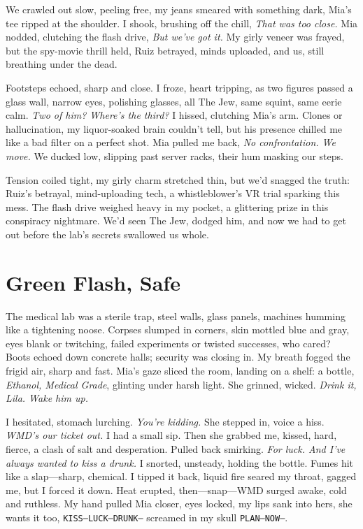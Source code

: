 \documentclass[12pt,oneside]{book}
\newcommand{\note}[1]{\texttt{#1}}
\begin{document}
We crawled out slow, peeling free, my jeans smeared with something dark, Mia’s tee ripped at the shoulder. I shook, brushing off the chill, \textit{That was too close.} Mia nodded, clutching the flash drive, \textit{But we’ve got it.} My girly veneer was frayed, but the spy-movie thrill held, Ruiz betrayed, minds uploaded, and us, still breathing under the dead.

Footsteps echoed, sharp and close. I froze, heart tripping, as two figures passed a glass wall, narrow eyes, polishing glasses, all The Jew, same squint, same eerie calm. \textit{Two of him? Where's the third?} I hissed, clutching Mia’s arm. Clones or hallucination, my liquor-soaked brain couldn’t tell, but his presence chilled me like a bad filter on a perfect shot. Mia pulled me back, \textit{No confrontation. We move.} We ducked low, slipping past server racks, their hum masking our steps.

Tension coiled tight, my girly charm stretched thin, but we’d snagged the truth: Ruiz’s betrayal, mind-uploading tech, a whistleblower’s VR trial sparking this mess. The flash drive weighed heavy in my pocket, a glittering prize in this conspiracy nightmare. We’d seen The Jew, dodged him, and now we had to get out before the lab’s secrets swallowed us whole.

\chapter{Green Flash, Safe}

The medical lab was a sterile trap, steel walls, glass panels, machines humming like a tightening noose. Corpses slumped in corners, skin mottled blue and gray, eyes blank or twitching, failed experiments or twisted successes, who cared? Boots echoed down concrete halls; security was closing in. My breath fogged the frigid air, sharp and fast. Mia’s gaze sliced the room, landing on a shelf: a bottle, \textit{Ethanol, Medical Grade}, glinting under harsh light. She grinned, wicked. \textit{Drink it, Lila. Wake him up.}

I hesitated, stomach lurching. \textit{You’re kidding.} 
She stepped in, voice a hiss. \textit{WMD’s our ticket out.} I had a small sip. Then she grabbed me, kissed, hard, fierce, a clash of salt and desperation. Pulled back smirking. \textit{For luck. And I’ve always wanted to kiss a drunk.}  
I snorted, unsteady, holding the bottle. Fumes hit like a slap—sharp, chemical. I tipped it back, liquid fire seared my throat, gagged me, but I forced it down. Heat erupted, then—snap—WMD surged awake, cold and ruthless. My hand pulled Mia closer, eyes locked, my lips sank into hers, she wants it too, \note {KISS—LUCK—DRUNK—} screamed in my skull \note{PLAN—NOW—}.
\end{document}
